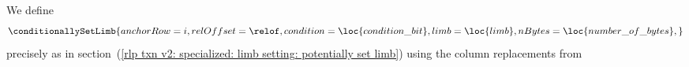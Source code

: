 We define
\[
	\conditionallySetLimb {
		anchorRow  = i                       ,
		relOffset  = \relof                  ,
		condition  = \loc{condition\_bit}    ,
		limb       = \loc{limb}              ,
		nBytes     = \loc{number\_of\_bytes} ,
	}
\]
precisely as in
section~(\ref{rlp txn v2: specialized: limb setting: potentially set limb})
using the column replacements from
